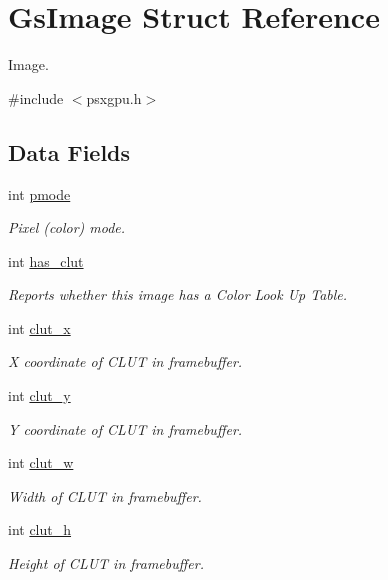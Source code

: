 \hypertarget{structGsImage}{}\section{Gs\+Image Struct Reference}
\label{structGsImage}


Image.  




{\ttfamily \#include $<$psxgpu.\+h$>$}

\subsection*{Data Fields}
\begin{DoxyCompactItemize}
\item 
int \hyperlink{structGsImage_a2a97f495c717e8dad31ea67e87945f5e}{pmode}
\begin{DoxyCompactList}\small\item\em Pixel (color) mode. \end{DoxyCompactList}\item 
int \hyperlink{structGsImage_a08d650746c51afda8d4e3bca004bba33}{has\+\_\+clut}
\begin{DoxyCompactList}\small\item\em Reports whether this image has a Color Look Up Table. \end{DoxyCompactList}\item 
int \hyperlink{structGsImage_a95c9c337ddbe24c03106d5df8c35e526}{clut\+\_\+x}
\begin{DoxyCompactList}\small\item\em X coordinate of C\+L\+U\+T in framebuffer. \end{DoxyCompactList}\item 
int \hyperlink{structGsImage_a9510563579c7ba86176a601d2adbe0c0}{clut\+\_\+y}
\begin{DoxyCompactList}\small\item\em Y coordinate of C\+L\+U\+T in framebuffer. \end{DoxyCompactList}\item 
int \hyperlink{structGsImage_a63347602889c710a8f2e21b71f82038f}{clut\+\_\+w}
\begin{DoxyCompactList}\small\item\em Width of C\+L\+U\+T in framebuffer. \end{DoxyCompactList}\item 
int \hyperlink{structGsImage_a26eca2ce5193f47874aada8354cafb80}{clut\+\_\+h}
\begin{DoxyCompactList}\small\item\em Height of C\+L\+U\+T in framebuffer. \end{DoxyCompactList}\item 

\end{DoxyCompactItemize}
